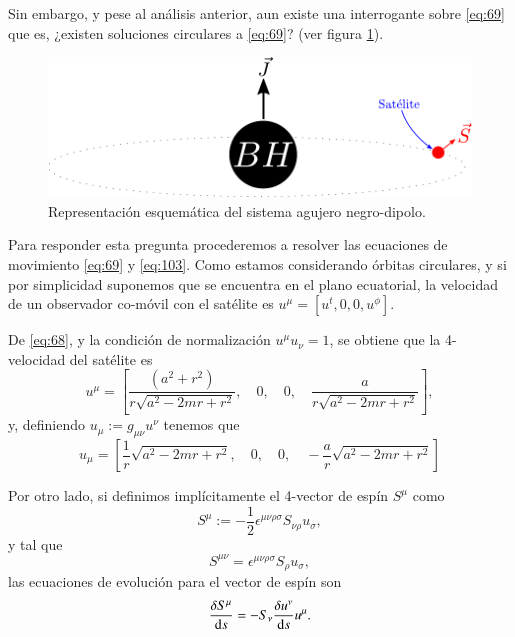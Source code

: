 Sin embargo, y pese al análisis anterior, aun existe una interrogante sobre \eqref{eq:69} que es, ¿existen soluciones circulares a \eqref{eq:69}? (ver figura \ref{fig:7}).
\begin{figure}[!h]
\centering
\includegraphics[scale=0.9]{images/solucion-en-kerr.pdf}
\caption[Solución helicoidal en Kerr]{Representación esquemática del sistema agujero negro-dipolo.}
\label{fig:7}
\end{figure}

Para responder esta pregunta procederemos a resolver las ecuaciones de movimiento \eqref{eq:69} y \eqref{eq:103}. Como estamos considerando órbitas circulares, y si por simplicidad suponemos que se encuentra en el plano ecuatorial, la velocidad de un observador co-móvil con el satélite es $u^{\mu} = \left[ u^t,0,0,u^{\phi} \right]$.

De \eqref{eq:68}, y la condición de normalización $u^{\mu}u_{\nu} = 1$, se obtiene que la 4-velocidad del satélite es
\begin{equation}
\label{eq:70}
u^{\mu} = \left [ \frac{\left(a^{2} + r^{2}\right)}{r\sqrt{a^{2} - 2 m r + r^{2}}}, \quad 0, \quad 0, \quad \frac{a}{r\sqrt{a^{2} - 2 m r + r^{2}}}\right ],
\end{equation}
y, definiendo $u_{\mu} := g_{\mu \nu} u^{\nu}$ tenemos que
\begin{equation}
\label{eq:71}
u_{\mu} = \left [ \frac{1}{r}\sqrt{a^{2} - 2 m r + r^{2}}, \quad 0, \quad 0, \quad -\frac{a}{r} \sqrt{a^{2} - 2 m r + r^{2}} \right ]
\end{equation}

Por otro lado, si definimos implícitamente el 4-vector de espín $S^{\mu}$ como 
\begin{equation}
S^{\mu} := -\frac{1}{2} \epsilon^{\mu \nu \rho \sigma} S_{\nu \rho} u_{\sigma},
\end{equation}
y tal que
\begin{equation}
S^{\mu \nu} = \epsilon^{\mu \nu \rho \sigma} S_{\rho} u_{\sigma},
\end{equation}
las ecuaciones de evolución para el vector de espín son
\begin{equation}
\label{eq:72}
\frac{\delta S^{\mu}}{\mathrm{d}s} = -S_{\nu} \frac{\delta u^{\nu}}{\mathrm{d}s} u^{\mu}.
\end{equation}


